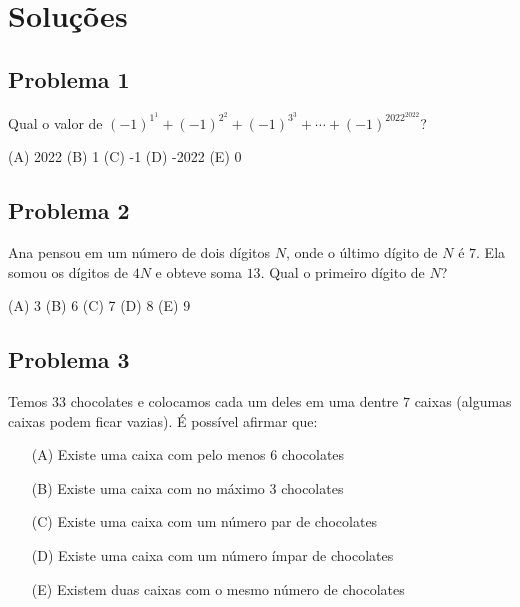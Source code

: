 \documentclass[12pt]{article}
\begin{document}
  \clearpage

  \section{\textsf{Soluções}}
\subsection{Problema 1}
\begin{tcolorbox}[statementbox]
      Qual o valor de $(-1)^{1^1} + (-1)^{2^2} + (-1)^{3^3} + \cdots + (-1)^{2022^{2022}}$?

(A) 2022 (B) 1 (C) -1 (D) -2022 (E) 0
\end{tcolorbox}
\clearpage

\subsection{Problema 2}
\begin{tcolorbox}[statementbox]
Ana pensou em um número de dois dígitos $N$, onde o último dígito de $N$ é $7$. Ela somou os dígitos de $4N$ e obteve soma $13$. Qual o primeiro dígito de $N$?

(A) 3 (B) 6 (C) 7 (D) 8 (E) 9
\end{tcolorbox}
\clearpage

\subsection{Problema 3}
\begin{tcolorbox}[statementbox]
Temos $33$ chocolates e colocamos cada um deles em uma dentre $7$ caixas (algumas caixas podem ficar vazias). É possível afirmar que:

\begin{enumerate}
\item[(A)] Existe uma caixa com pelo menos $6$ chocolates
\item[(B)] Existe uma caixa com no máximo $3$ chocolates
\item[(C)] Existe uma caixa com um número par de chocolates
\item[(D)] Existe uma caixa com um número ímpar de chocolates
\item[(E)] Existem duas caixas com o mesmo número de chocolates
\end{enumerate}
\end{tcolorbox}
\clearpage
\end{document}
